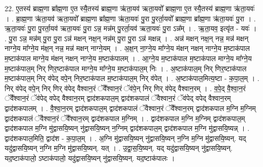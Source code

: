 \documentclass[17pt]{extarticle}
\begin{document}
22. ए॒तस्य॑ ब्राह्म॒णा ब्रा᳚ह्म॒णा ए॒त स्यै॒तस्य॑ ब्राह्म॒णा ऋ॑ता॒यव॑ ऋता॒यवो᳚ ब्राह्म॒णा ए॒त स्यै॒तस्य॑ ब्राह्म॒णा ऋ॑ता॒यवः॑ । . ब्रा॒ह्म॒णा ऋ॑ता॒यव॑ ऋता॒यवो᳚ ब्राह्म॒णा ब्रा᳚ह्म॒णा ऋ॑ता॒यवः॑ पु॒रा पु॒रर्ता॒यवो᳚ ब्राह्म॒णा ब्रा᳚ह्म॒णा ऋ॑ता॒यवः॑ पु॒रा । . ऋ॒ता॒यवः॑ पु॒रा पु॒रर्ता॒यव॑ ऋता॒यवः॑ पु॒रा ऽन्न॒ मन्न॑म् पु॒रर्ता॒यव॑ ऋता॒यवः॑ पु॒रा ऽन्न᳚म् । . ऋ॒ता॒यव॒ इत्यृ॑त - यवः॑ । . पु॒रा ऽन्न॒ मन्न॑म् पु॒रा पु॒रा ऽन्न॑ मक्षन् नक्ष॒न् नन्न॑म् पु॒रा पु॒रा ऽन्न॑ मक्षन्न् । . अन्न॑ मक्षन् नक्ष॒न् नन्न॒ मन्न॑ मक्षन् नाग्ने॒य मा᳚ग्ने॒य म॑क्ष॒न् नन्न॒ मन्न॑ मक्षन् नाग्ने॒यम् । . अ॒क्ष॒न् ना॒ग्ने॒य मा᳚ग्ने॒य म॑क्षन् नक्षन् नाग्ने॒य म॒ष्टाक॑पाल म॒ष्टाक॑पाल माग्ने॒य म॑क्षन् नक्षन् नाग्ने॒य म॒ष्टाक॑पालम् । . आ॒ग्ने॒य म॒ष्टाक॑पाल म॒ष्टाक॑पाल माग्ने॒य मा᳚ग्ने॒य म॒ष्टाक॑पाल॒म् निर् णिर॒ष्टाक॑पाल माग्ने॒य मा᳚ग्ने॒य म॒ष्टाक॑पाल॒म् निः । . अ॒ष्टाक॑पाल॒म् निर् णिर॒ष्टाक॑पाल म॒ष्टाक॑पाल॒म् निर् व॑पेद् वपे॒न् निर॒ष्टाक॑पाल म॒ष्टाक॑पाल॒म् निर् व॑पेत् । . अ॒ष्टाक॑पाल॒मित्य॒ष्टा - क॒पा॒ल॒म् । . निर् व॑पेद् वपे॒न् निर् णिर् व॑पेद् वैश्वान॒रं ॅवै᳚श्वान॒रं ॅव॑पे॒न् निर् णिर् व॑पेद् वैश्वान॒रम् । . व॒पे॒द् वै॒श्वा॒न॒रं ॅवै᳚श्वान॒रं ॅव॑पेद् वपेद् वैश्वान॒रम् द्वाद॑शकपाल॒म् द्वाद॑शकपालं ॅवैश्वान॒रं ॅव॑पेद् वपेद् वैश्वान॒रम् द्वाद॑शकपालम् । . वै॒श्वा॒न॒रम् द्वाद॑शकपाल॒म् द्वाद॑शकपालं ॅवैश्वान॒रं ॅवै᳚श्वान॒रम् द्वाद॑शकपाल म॒ग्नि म॒ग्निम् द्वाद॑शकपालं ॅवैश्वान॒रं ॅवै᳚श्वान॒रम् द्वाद॑शकपाल म॒ग्निम् । . द्वाद॑शकपाल म॒ग्नि म॒ग्निम् द्वाद॑शकपाल॒म् द्वाद॑शकपाल म॒ग्नि मु॑द्वासयि॒ष्यन् नु॑द्वासयि॒ष्यन् न॒ग्निम् द्वाद॑शकपाल॒म् द्वाद॑शकपाल म॒ग्नि मु॑द्वासयि॒ष्यन्न् । . द्वाद॑शकपाल॒मिति॒ द्वाद॑श - क॒पा॒ल॒म् । . अ॒ग्नि मु॑द्वासयि॒ष्यन् नु॑द्वासयि॒ष्यन् न॒ग्नि म॒ग्नि मु॑द्वासयि॒ष्यन्. यद् यदु॑द्वासयि॒ष्यन् न॒ग्नि म॒ग्नि मु॑द्वासयि॒ष्यन्. यत् । . उ॒द्वा॒स॒यि॒ष्यन्. यद् यदु॑द्वासयि॒ष्यन् नु॑द्वासयि॒ष्यन्. यद॒ष्टाक॑पालो॒ ऽष्टाक॑पालो॒ यदु॑द्वासयि॒ष्यन् नु॑द्वासयि॒ष्यन्. यद॒ष्टाक॑पालः । \newline
\end{document}
